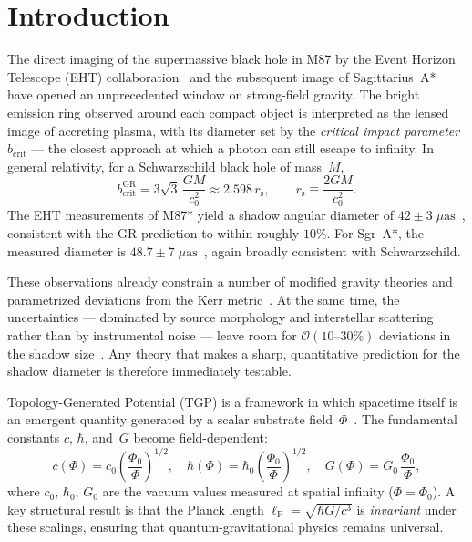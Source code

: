 \documentclass[11pt,a4paper]{article}
\theoremstyle{definition}
\theoremstyle{remark}
\newcommand{\PhiZero}{\varPhi_0}
\newcommand{\lP}{\ell_{\mathrm{P}}}
\newcommand{\rs}{r_{\mathrm{s}}}
\newcommand{\bcrit}{b_{\mathrm{crit}}}
\renewcommand{\Phi}{\varPhi}
\begin{document}
\tableofcontents

\section{Introduction}\label{sec:intro}

The direct imaging of the supermassive black hole in M87 by the Event
Horizon Telescope (EHT) collaboration~\cite{EHT-M87-2019,EHT-M87-VI}
and the subsequent image of Sagittarius~A*~\cite{EHT-SgrA-2022} have
opened an unprecedented window on strong-field gravity.  The bright
emission ring observed around each compact object is interpreted as the
lensed image of accreting plasma, with its diameter set by the \emph{%
critical impact parameter} $\bcrit$ --- the closest approach at which a
photon can still escape to infinity.  In general relativity, for a
Schwarzschild black hole of mass~$M$,
\begin{equation}\label{eq:bcrit-GR}
  \bcrit^{\mathrm{GR}}
  = 3\sqrt{3}\,\frac{GM}{c_0^2}
  \approx 2.598\,\rs,
  \qquad
  \rs \equiv \frac{2GM}{c_0^2}.
\end{equation}
The EHT measurements of M87* yield a shadow angular diameter of
$42 \pm 3\;\mu\mathrm{as}$~\cite{EHT-M87-VI}, consistent with the GR
prediction to within roughly $10\%$.  For Sgr~A*, the measured diameter
is $48.7 \pm 7\;\mu\mathrm{as}$~\cite{EHT-SgrA-2022}, again broadly
consistent with Schwarzschild.

These observations already constrain a number of modified gravity
theories and parametrized deviations from the Kerr
metric~\cite{Psaltis2020,Vagnozzi2023,Johannsen2013}.  At the same
time, the uncertainties --- dominated by source morphology and
interstellar scattering rather than by instrumental noise --- leave room
for $\mathcal{O}(10\text{--}30\%)$ deviations in the shadow
size~\cite{Perlick2022,Cunha2018}.  Any theory that makes a sharp,
quantitative prediction for the shadow diameter is therefore immediately
testable.

\medskip

Topology-Generated Potential (TGP) is a framework in which spacetime
itself is an emergent quantity generated by a scalar substrate
field~$\Phi$~\cite{Serafin2026-full,TGP-repo}.  The fundamental
constants $c$, $\hbar$, and~$G$ become field-dependent:
\begin{equation}\label{eq:scalings}
  c(\Phi) = c_0\!\left(\frac{\PhiZero}{\Phi}\right)^{\!1/2}\!,
  \quad
  \hbar(\Phi) = \hbar_0\!\left(\frac{\PhiZero}{\Phi}\right)^{\!1/2}\!,
  \quad
  G(\Phi) = G_0\,\frac{\PhiZero}{\Phi},
\end{equation}
where $c_0$, $\hbar_0$, $G_0$ are the vacuum values measured at spatial
infinity ($\Phi = \PhiZero$).  A key structural result is that the Planck
length $\lP = \sqrt{\hbar G/c^3}$ is \emph{invariant} under these
scalings, ensuring that quantum-gravitational physics remains universal.
\end{document}
